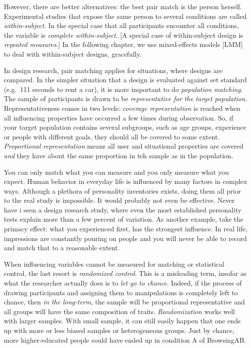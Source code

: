\documentclass[]{svmono}
\theoremstyle{definition}
\theoremstyle{definition}
\theoremstyle{definition}
\theoremstyle{remark}
\begin{document}
However, there are better alternatives: the best pair match is the
person herself. Experimental studies that expose the same person to
several conditions are called \emph{within-subject}. In the special case
that all participants encounter all conditions, the variable is
\emph{complete within-subject}. {[}A special case of within-subject
design is \emph{repeated measures}.{]} In the following chapter, we use
mixed-effects models {[}LMM{]} to deal with within-subject designs,
gracefully.

In design research, pair matching applies for situations, where designs
are compared. In the simpler situation that a design is evaluated
against set standard (e.g.~111 seconds to rent a car), it is more
important to do \emph{population matching}. The sample of participants
is drawn to be \emph{representative for the target population}.
Representativeness comes in two levels: \emph{coverage representation}
is reached when all influencing properties have occurred a few times
during observation. So, if your target population contains several
subgroups, such as age groups, experience or people with different
goals, they should all be covered to some extent. \emph{Proportional
representation} means all user and situational properties are covered
\emph{and} they have about the same proportion in teh sample as in the
population.

You can only match what you can measure and you only measure what you
expect. Human behavior in everyday life is influenced by many factors in
complex ways. Although a plethora of personality inventories exists,
doing them all prior to the real study is impossible. It would probably
not even be effective. Never have i seen a design research study, where
even the most established personality tests explain more than a few
percent of variation. As another example, take the primacy effect: what
you experienced first, has the strongest influence. In real life,
impressions are constantly pouring on people and you will never be able
to record and match that to a reasonable extent.

When influencing variables cannot be measured for matching or
statistical control, the last resort is \emph{randomized control}. This
is a misleading term, insofar as what the researcher actually does is to
\emph{let go to chance}. Indeed, if the process of drawing participants
and assigning them to manipulations is completely left to chance, then
\emph{in the long-term}, the sample will be proportional representative
and all groups will have the same composition of traits.
\emph{Randomization} works well with larger samples. With small sample,
it can still easily happen that one ends up with more or less biased
samples or heterogeneous groups. Just by chance, more higher-educated
people could have ended up in condition A of BrowsingAB.
\end{document}
